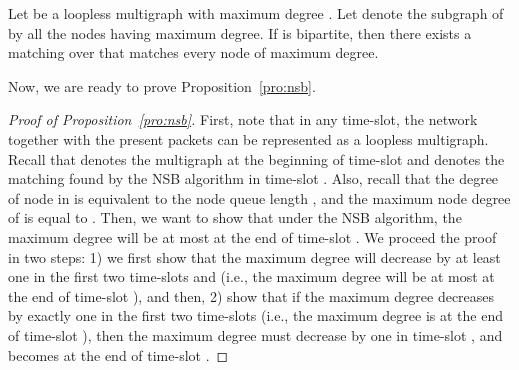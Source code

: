 \documentclass[10pt,journal,compsoc]{IEEEtran}
\newcommand{\high}[1]{{\color{black}{#1}}}
\begin{document}
\begin{lemma}
\label{lem:delta}
Let  be a loopless multigraph with maximum degree . Let  denote 
the subgraph of  \high{induced\footnote{\high{An induced subgraph of a graph is formed from 
a subset of the nodes of the graph and all of the edges whose endpoints are both in this subset.}}}
by all the nodes having maximum degree. If  
is bipartite, then there exists a matching over  that matches every node of maximum degree.
\end{lemma}

Now, we are ready to prove Proposition~\ref{pro:nsb}. 


\begin{proof}[Proof of Proposition~\ref{pro:nsb}]
First, note that in any time-slot, the network together with the present packets can be 
represented as a loopless multigraph.
Recall that  denotes the multigraph at the beginning of time-slot  and 
 denotes the matching found by the NSB algorithm in time-slot . Also, recall 
that the degree of node  in  is equivalent to the node queue length 
, and the maximum node degree of  is equal to .
\high{Now, consider any frame  consisting of three consecutive time-slots 
, where . 
Suppose that the maximum node queue length is no smaller than two at the beginning of 
frame , i.e.,  at the beginning of time-slot .}
Then, we want to show that under the NSB algorithm, the maximum degree will be 
at most  at the end of time-slot .
We proceed the proof in two steps: 
1) we first show that the maximum degree will decrease by at least one in the first 
two time-slots  and  (i.e., the maximum degree will be at most 
at the end of time-slot ),
and then, 2) show that if the maximum degree decreases by exactly one in the first 
two time-slots (i.e., the maximum degree is  at the end of time-slot ), 
then the maximum degree must decrease by one in time-slot , and becomes 
 at the end of time-slot . 


\end{proof}
\end{document}
